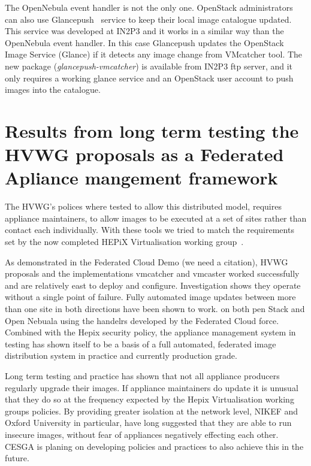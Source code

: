 \documentclass{llncs_Ibergrid2013}
\begin{document}
The OpenNebula event handler is not the only one. OpenStack administrators can also use Glancepush~\cite{glancepush} service to keep their local image catalogue updated. 
This service was developed at IN2P3 and it works in a similar way than the OpenNebula event handler. 
In this case Glancepush updates the OpenStack Image Service (Glance) if it detects any image change from VMcatcher tool. 
The new package (\textit{glancepush-vmcatcher}) is available from IN2P3 ftp server, and it only requires a working glance service and an OpenStack user account to push images into the catalogue.



\section{Results from long term testing the HVWG proposals as a Federated Apliance mangement framework}
\label{sect-experiances}

The HVWG's polices where tested to allow this distributed model, requires appliance maintainers, to allow images to be executed at a set of sites rather than contact each individually. With these tools we tried to match the requirements set by the now completed HEPiX Virtualisation working group~\cite{hepix}.

As demonstrated in the Federated Cloud Demo (we need a citation), HVWG proposals and the implementations vmcatcher and vmcaster worked successfully and are relatively east to deploy and configure. Investigation shows they operate without a single point of failure. Fully automated image updates between more than one site in both directions have been shown to work. on both pen Stack and Open Nebuala using the handelrs developed by the Federated Cloud force. Combined with the Hepix security policy, the appliance management system in testing has shown itself to be a basis of a full automated, federated image distribution system in practice and currently production grade.

Long term testing and practice has shown that not all appliance producers regularly upgrade their images. If appliance maintainers do update it is unusual that they do so at the frequency expected by the Hepix Virtualisation working groups policies. By providing greater isolation at the network level, NIKEF and Oxford University in particular, have long suggested that they are able to run insecure images, without fear of appliances negatively effecting each other. CESGA is planing on developing policies and practices to also achieve this in the future.
\end{document}
